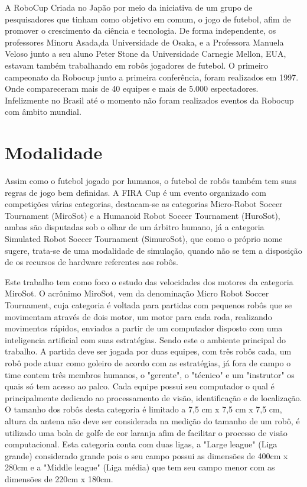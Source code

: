 \documentclass[a4paper,12pt,portuguese]{ufms-cpcx}
\begin{document}
A RoboCup Criada no Japão por meio da iniciativa de um grupo de pesquisadores que tinham como objetivo em comum, o jogo de futebol, afim de promover o crescimento da ciência e tecnologia. De forma independente, os professores Minoru Asada,da Universidade de Osaka, e a Professora Manuela Veloso junto a seu aluno Peter Stone da Universidade Carnegie Mellon, EUA, estavam também trabalhando em robôs jogadores de futebol.
O primeiro campeonato da Robocup junto a primeira conferência, foram realizados em 1997. Onde compareceram mais de 40 equipes e mais de 5.000 espectadores. Infelizmente no Brasil até o momento não foram realizados eventos da Robocup com âmbito mundial.

\section{Modalidade} %
Assim como o futebol jogado por humanos, o futebol de robôs também tem suas regras de jogo bem definidas. A FIRA Cup é um evento organizado com competições várias categorias, destacam-se as categorias Micro-Robot Soccer Tournament (MiroSot) e a Humanoid Robot Soccer Tournament (HuroSot), ambas são disputadas sob o olhar de um árbitro humano, já a categoria Simulated Robot Soccer Tournament (SimuroSot), que como o próprio nome sugere, trata-se de uma modalidade de simulação, quando não se tem a disposição de os recursos de hardware referentes aos robôs.

Este trabalho tem como foco o estudo das velocidades dos motores da categoria MiroSot. O acrônimo MiroSot, vem da denominação Micro Robot Soccer Tournament, cuja categoria é voltada para partidas com pequenos robôs que se movimentam através de dois motor, um motor para cada roda, realizando movimentos rápidos, enviados a partir de um computador disposto com uma inteligencia artificial com suas estratégias. Sendo este o ambiente principal do trabalho.
A partida deve ser jogada por duas equipes, com três robôs cada, um robô pode atuar como goleiro de acordo com as estratégias, já fora de campo o time contem três membros humanos, o "gerente", o "técnico" e um "instrutor" os quais só tem acesso ao palco. Cada equipe possui seu computador o qual é principalmente dedicado ao processamento de visão, identificação e de localização.  
O tamanho dos robôs desta categoria é limitado a 7,5 cm x 7,5 cm x 7,5 cm, altura da antena não deve ser considerada na medição do tamanho de um robô, é utilizado uma bola de golfe de cor laranja afim de facilitar o processo de visão computacional.
Esta categoria conta com duas ligas, a "Large league" (Liga grande) considerado grande pois o seu campo possui as dimensões de 400cm x 280cm e a "Middle league" (Liga média) que tem seu campo menor com as dimensões de 220cm x 180cm.
\end{document}
